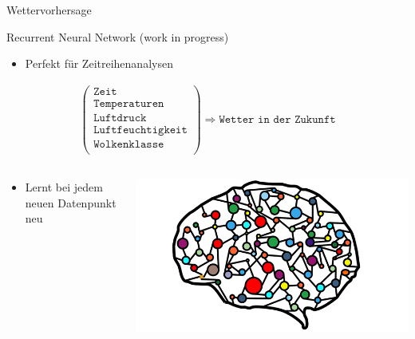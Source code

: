 \begin{frame}[t]{Wettervorhersage}
  \begin{block}{Recurrent Neural Network \tiny\alert{(work in progress)}}
    \begin{itemize}
      \item Perfekt f\"ur Zeitreihenanalysen
    \end{itemize}
    \begin{align*}
      \left(\begin{matrix}
          \texttt{Zeit} \\
          \texttt{Temperaturen} \\
          \texttt{Luftdruck} \\
          \texttt{Luftfeuchtigkeit} \\
          \texttt{Wolkenklasse} \\
      \end{matrix}\right)
      \Longrightarrow \texttt{Wetter in der Zukunft}
    \end{align*}
    \begin{columns}[onlytextwidth]
      \begin{column}{0.48\textwidth}
        \begin{itemize}
          \item Lernt bei jedem neuen Datenpunkt neu
        \end{itemize}
      \end{column}
      \begin{column}{0.48\textwidth}
        \centering
        \includegraphics[height=0.2\textheight]{picture/neuralnet_brain.png}
      \end{column}
    \end{columns}
  \end{block}
\end{frame}
